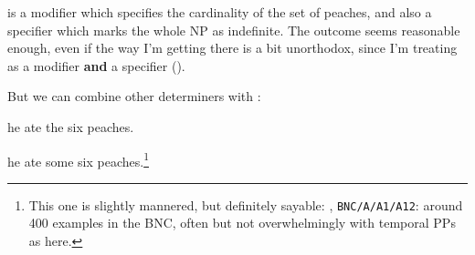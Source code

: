 \documentclass[11pt,a4paper]{article}
\begin{document}
\noindent
{} is a modifier which specifies the cardinality of the set of
peaches, and also a specifier which marks the whole NP as
indefinite. The outcome seems reasonable enough, even if the way I'm
getting there is a bit unorthodox, since I'm treating  as a
modifier \textbf{and} a specifier ().

\newpage
But we can combine other determiners with : 

\begin{examples}
\item
\begin{examples}
\item he ate the six peaches.
\item he ate some six peaches.\footnote{This one is slightly
mannered, but definitely sayable: ,
\texttt{BNC/A/A1/A12}: around 400 examples in the BNC, often but not
overwhelmingly with
temporal PPs as here.}
\end{examples}
\end{examples}
\end{document}
